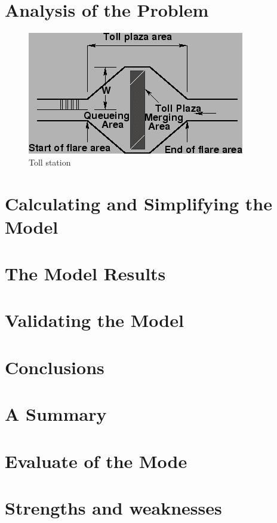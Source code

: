 \documentclass{mcmthesis}
\begin{document}
\section{Analysis of the Problem}
\begin{figure}[htbp]
\small
\centering
\caption{Toll station \cite{note}} \label{fig:Ts}
\includegraphics{img3.png}
\end{figure}


\section{Calculating and Simplifying the Model  }


\section{The Model Results}


\section{Validating the Model}


\section{Conclusions}

\section{A Summary}


\section{Evaluate of the Mode}

\section{Strengths and weaknesses}
\end{document}
